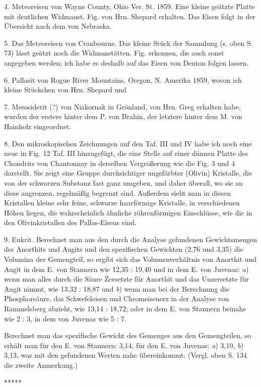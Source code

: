 \documentclass[a4paper, 11pt, oneside]{article}
\begin{document}
4. Meteoreisen von Wayne County, Ohio Ver. St. 1859. Eine kleine geätzte Platte mit deutlichen Widmanst. Fig. von Hrn. Shepard erhalten. Das Eisen folgt in der Übersicht nach dem von Nebraska.

5. Das Meteoreisen von Cranbourne. Das kleine Stück der Sammlung (s. oben S. 73) lässt geätzt noch die Widmanstätten. Fig. erkennen, die auch sonst angegeben werden; ich habe es deshalb auf das Eisen von Denton folgen lassen.

6. Pallasit von Rogue River Mountains, Oregon, N. Amerika 1859, wovon ich kleine Stückchen von Hrn. Shepard und

7. Mesosiderit (?) von Niakornak in Grönland, von Hrn. Greg erhalten habe, wurden der erstere hinter dem P. von Brahin, der letztere hinter dem M. von Hainholz eingeordnet.

8. Den mikroskopischen Zeichnungen auf den Taf. III und IV habe ich noch eine neue in Fig. 12 Taf. III hinzugefügt, die eine Stelle auf einer dünnen Platte des Chondrits von Chantonnay in derselben Vergrößerung wie die Fig. 3 und 4 darstellt. Sie zeigt eine Gruppe durchsichtiger ungefärbter (Olivin) Kristalle, die von der schwarzen Substanz fast ganz umgeben, und daher überall, wo sie an diese angrenzen, regelmäßig begrenzt sind. Außerdem sieht man in diesen Kristallen kleine sehr feine, schwarze haarförmige Kristalle, in verschiedenen Höhen liegen, die wahrscheinlich ähnliche röhrenförmigen Einschlüsse, wie die in den Olivinkristallen des Pallas-Eisens sind.

9. Eukrit. Berechnet man aus den durch die Analyse gefundenen Gewichtsmengen des Anorthits und Augits und den spezifischen Gewichten (2,76 und 3,35) die Volumina der Gemengteil, so ergibt sich das Volumenverhältnis von Anorthit und Augit in dem E. von Stannern wie 12,35 : 19,40 und in dem E. von Juvenas: \emph{a}) wenn man alles durch die Säure Zersetzte für Anorthit und das Unzersetzte für Augit nimmt, wie 13,32 : 18,87 und \emph{b}) wenn man bei der Berechnung die Phosphorsäure, das Schwefeleisen und Chromeisenerz in der Analyse von Rammelsberg abzieht, wie 13,14 : 18,72; oder in dem E. von Stannern beinahe wie 2 : 3, in dem von Juvenas wie 5 : 7.

Berechnet man das spezifische Gewicht des Gemenges aus den Gemengteilen, so erhält man für den E. von Stannern: 3,14; für den E. von Juvenas: \emph{a}) 3,10, \emph{b}) 3,13, was mit den gefundenen Werten nahe übereinkommt. (Vergl. oben S. 134 die zweite Anmerkung.)

\centerline{*\hspace{15mm}*\hspace{15mm}*\hspace{15mm}*\hspace{15mm}*}
\clearpage
\end{document}
